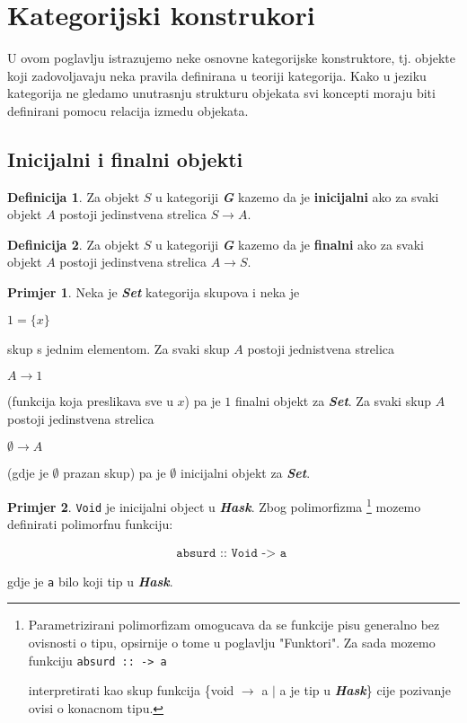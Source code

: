 \documentclass[11pt]{article}
\newcommand{\category}[1]{\textbf{\emph{#1}}}
\newcommand{\codei}[1]{
  {\lstinline[basicstyle=\ttfamily]{#1}}
}
\newcommand{\code}[1]{
  \begin{align*}
    \texttt{#1}
  \end{align*}
  }
\theoremstyle{definition}
\newtheorem{definition}{Definicija}
\newtheorem{primjer}{Primjer}
\begin{document}
  \section{Kategorijski konstrukori}
  U ovom poglavlju istrazujemo neke osnovne kategorijske
  konstruktore, tj. objekte koji zadovoljavaju neka pravila definirana u teoriji
  kategorija. Kako u jeziku kategorija ne gledamo unutrasnju strukturu objekata
  svi koncepti moraju biti definirani pomocu relacija izmedu objekata.
  \subsection{Inicijalni i finalni objekti}
  \begin{definition}
    Za objekt $S$ u kategoriji \category{G} kazemo da je \textbf{inicijalni} ako za svaki
    objekt $A$ postoji jedinstvena strelica $S \xrightarrow{} A$.
  \end{definition}
  \begin{definition}
    Za objekt $S$ u kategoriji \category{G} kazemo da je \textbf{finalni} ako za svaki
    objekt $A$ postoji jedinstvena strelica $A \xrightarrow{} S$.
  \end{definition}
  \begin{primjer}
    Neka je \category{Set} kategorija skupova i neka je 
    \begin{center}
      $1 = \{x\}$
    \end{center}
    skup s jednim elementom. Za svaki skup $A$ postoji jednistvena strelica
    \begin{center}
      $A \xrightarrow{} 1$
    \end{center}
    (funkcija koja preslikava sve u $x$) pa je $1$ finalni objekt za
    \category{Set}.
    Za svaki skup $A$ postoji jedinstvena strelica
    \begin{center}
      $\emptyset \xrightarrow{} A$
    \end{center}
    (gdje je $\emptyset$ prazan skup) pa je $\emptyset$ inicijalni objekt za
    \category{Set}.
  \end{primjer}
  \begin{primjer} \codei{Void} je inicijalni object u \category{Hask}.
    Zbog polimorfizma \footnote{Parametrizirani polimorfizam omogucava da se
      funkcije pisu generalno bez ovisnosti o tipu, opsirnije o tome u
      poglavlju "Funktori". Za sada mozemo funkciju \codei{absurd :: -> a}
      interpretirati kao skup funkcija \{void $\to$ a $|$ a je tip u
      \category{Hask}\} cije pozivanje ovisi o konacnom tipu.} mozemo definirati polimorfnu funkciju:
    \code{
      absurd :: Void -> a
    }
    gdje je \codei{a} bilo koji tip u \category{Hask}.
  \end{primjer}
\end{document}
